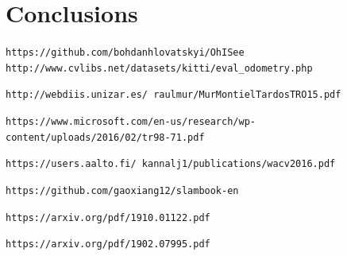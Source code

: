 \section{Conclusions}

\appendix

\begin{thebibliography}{10}

 \texttt{https://github.com/bohdanhlovatskyi/OhISee}
 \texttt{http://www.cvlibs.net/datasets/kitti/eval_odometry.php}

 \texttt{http://webdiis.unizar.es/~raulmur/MurMontielTardosTRO15.pdf}

 \texttt{https://www.microsoft.com/en-us/research/wp-content/uploads/2016/02/tr98-71.pdf} 

 \texttt{https://users.aalto.fi/~kannalj1/publications/wacv2016.pdf}

 \texttt{https://github.com/gaoxiang12/slambook-en}

 \texttt{https://arxiv.org/pdf/1910.01122.pdf}

 \texttt{https://arxiv.org/pdf/1902.07995.pdf}

\end{thebibliography}


